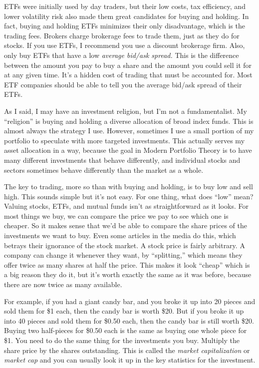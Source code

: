ETFs were initially used by day traders, but their low costs, tax efficiency, and lower volatility risk also made them great candidates for buying and holding. In fact, buying and holding ETFs minimizes their only disadvantage, which is the trading fees. Brokers charge brokerage fees to trade them, just as they do for stocks. If you use ETFs, I recommend you use a discount brokerage firm. Also, only buy ETFs that have a low \emph{average bid/ask spread.} This is the difference between the amount you pay to buy a share and the amount you could sell it for at any given time. It's a hidden cost of trading that must be accounted for. Most ETF companies should be able to tell you the average bid/ask spread of their ETFs.

As I said, I may have an investment religion, but I'm not a fundamentalist. My ``religion'' is buying and holding a diverse allocation of broad index funds. This is almost always the strategy I use. However, sometimes I use a small portion of my portfolio to speculate with more targeted investments. This actually serves my asset allocation in a way, because the goal in Modern Portfolio Theory is to have many different investments that behave differently, and individual stocks and sectors sometimes behave differently than the market as a whole.

The key to trading, more so than with buying and holding, is to buy low and sell high. This sounds simple but it's not easy. For one thing, what does ``low'' mean? Valuing stocks, ETFs, and mutual funds isn't as straightforward as it looks. For most things we buy, we can compare the price we pay to see which one is cheaper. So it makes sense that we'd be able to compare the share prices of the investments we want to buy. Even some articles in the media do this, which betrays their ignorance of the stock market. A stock price is fairly arbitrary. A company can change it whenever they want, by ``splitting,'' which means they offer twice as many shares at half the price. This makes it look ``cheap'' which is a big reason they do it, but it's worth exactly the same as it was before, because there are now twice as many available.

For example, if you had a giant candy bar, and you broke it up into 20 pieces and sold them for \$1 each, then the candy bar is worth \$20. But if you broke it up into 40 pieces and sold them for \$0.50 each, then the candy bar is still worth \$20. Buying two half-pieces for \$0.50 each is the same as buying one whole piece for \$1. You need to do the same thing for the investments you buy. Multiply the share price by the shares outstanding. This is called the \emph{market capitalization} or \emph{market cap} and you can usually look it up in the key statistics for the investment.

